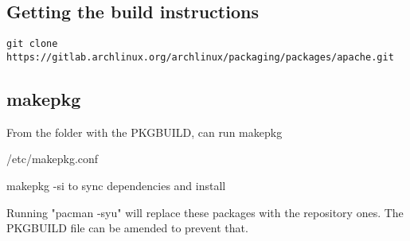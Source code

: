 
\subsection{Getting the build instructions}

\begin{verbatim}
git clone https://gitlab.archlinux.org/archlinux/packaging/packages/apache.git
\end{verbatim}

\subsection{makepkg}

From the folder with the PKGBUILD, can run makepkg

/etc/makepkg.conf

makepkg -si to sync dependencies and install

Running "pacman -syu" will replace these packages with the repository ones. The PKGBUILD file can be amended to prevent that.
